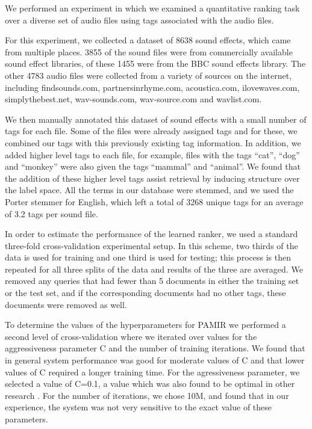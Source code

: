 We performed an experiment in which we examined a quantitative ranking
task over a diverse set of audio files using tags associated with the
audio files.

For this experiment, we collected a dataset of 8638 sound effects,
which came from multiple places.  3855 of the sound files were from
commercially available sound effect libraries, of these 1455 were from
the BBC sound effects library.  The other 4783 audio files were
collected from a variety of sources on the internet, including
findsounds.com, partnersinrhyme.com, acoustica.com, ilovewaves.com,
simplythebest.net, wav-sounds.com, wav-source.com and wavlist.com.

We then manually annotated this dataset of sound effects with a small
number of tags for each file.  Some of the files were already assigned
tags and for these, we combined our tags with this previously existing
tag information.  In addition, we added higher level tags to each
file, for example, files with the tags ``cat'', ``dog'' and ``monkey''
were also given the tags ``mammal'' and ``animal''.  We found that the
addition of these higher level tags assist retrieval by inducing
structure over the label space.  All the terms in our database were
stemmed, and we used the Porter stemmer for English, which left a
total of 3268 unique tags for an average of 3.2 tags per sound file.

In order to estimate the performance of the learned ranker, we used a
standard three-fold cross-validation experimental setup.  In this
scheme, two thirds of the data is used for training and one third is
used for testing; this process is then repeated for all three splits
of the data and results of the three are averaged.  We removed any
queries that had fewer than 5 documents in either the training set or
the test set, and if the corresponding documents had no other tags,
these documents were removed as well.

To determine the values of the hyperparameters for PAMIR we performed a
second level of cross-validation where we iterated over values for the
aggressiveness parameter C and the number of training iterations.  We
found that in general system performance was good for moderate values
of C and that lower values of C required a longer training time.  For
the agressiveness parameter, we selected a value of C=0.1, a value
which was also found to be optimal in other research
\cite{grangier2008}.  For the number of iterations, we chose 10M, and
found that in our experience, the system was not very sensitive to the
exact value of these parameters.

